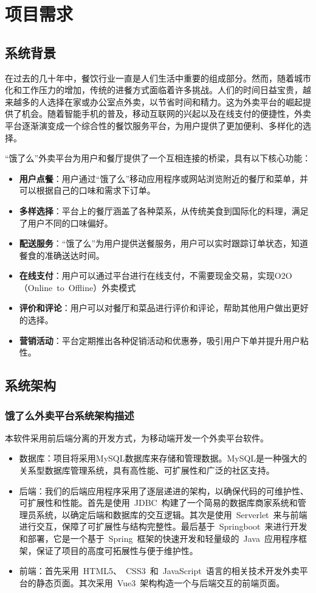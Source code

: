 \chapter{项目需求}

\section{系统背景}
在过去的几十年中，餐饮行业一直是人们生活中重要的组成部分。然而，随着城市化和工作压力的增加，传统的进餐方式面临着许多挑战。人们的时间日益宝贵，越来越多的人选择在家或办公室点外卖，以节省时间和精力。这为外卖平台的崛起提供了机会。随着智能手机的普及，移动互联网的兴起以及在线支付的便捷性，外卖平台逐渐演变成一个综合性的餐饮服务平台，为用户提供了更加便利、多样化的选择。

“饿了么”外卖平台为用户和餐厅提供了一个互相连接的桥梁，具有以下核心功能：
\begin{itemize}
    \item{\textbf{用户点餐}}：用户通过“饿了么”移动应用程序或网站浏览附近的餐厅和菜单，并可以根据自己的口味和需求下订单。
    \item{\textbf{多样选择}}：平台上的餐厅涵盖了各种菜系，从传统美食到国际化的料理，满足了用户不同的口味偏好。
    \item{\textbf{配送服务}}：“饿了么”为用户提供送餐服务，用户可以实时跟踪订单状态，知道餐食的准确送达时间。
    \item{\textbf{在线支付}}：用户可以通过平台进行在线支付，不需要现金交易，实现O2O（Online~to~Offline）外卖模式
    \item{\textbf{评价和评论}}：用户可以对餐厅和菜品进行评价和评论，帮助其他用户做出更好的选择。
    \item{\textbf{营销活动}}：平台定期推出各种促销活动和优惠券，吸引用户下单并提升用户粘性。
\end{itemize}

\section{系统架构}
\subsection{饿了么外卖平台系统架构描述}
本软件采用前后端分离的开发方式，为移动端开发一个外卖平台软件。
\begin{itemize}
    \item {数据库}：项目将采用MySQL数据库来存储和管理数据。MySQL是一种强大的关系型数据库管理系统，具有高性能、可扩展性和广泛的社区支持。
    \item {后端}：我们的后端应用程序采用了逐层递进的架构，以确保代码的可维护性、可扩展性和性能。首先是使用~JDBC~构建了一个简易的数据库商家系统和管理员系统，以确定后端和数据库的交互逻辑。其次是使用~Serverlet~来与前端进行交互，保障了可扩展性与结构完整性。最后基于~Springboot~来进行开发和部署，它是一个基于~Spring~框架的快速开发和轻量级的~Java~应用程序框架，保证了项目的高度可拓展性与便于维护性。
    \item {前端}：首先采用~HTML5、~CSS3~和~JavaScript~语言的相关技术开发外卖平台的静态页面。其次采用~Vue3~架构构造一个与后端交互的前端页面。
\end{itemize}
